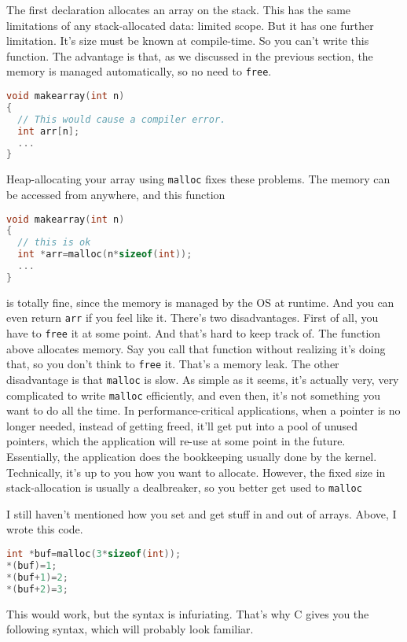 \documentclass[ebook,11pt,oneside,openany]{memoir}
\begin{document}
The first declaration allocates an array on the stack. This has the same limitations of any stack-allocated data: limited scope. But it has one further limitation. It's size must be known at compile-time. So you can't write this function. The advantage is that, as we discussed in the previous section, the memory is managed automatically, so no need to \texttt{free}.

\begin{lstlisting}[language=C]
void makearray(int n) 
{
  // This would cause a compiler error.
  int arr[n];
  ...
}
\end{lstlisting}

Heap-allocating your array using \texttt{malloc} fixes these problems. The memory can be accessed from anywhere, and this function 

\begin{lstlisting}[language=C]
void makearray(int n) 
{
  // this is ok
  int *arr=malloc(n*sizeof(int));
  ...
}
\end{lstlisting}

is totally fine, since the memory is managed by the OS at runtime. And you can even return \texttt{arr} if you feel like it. There's two disadvantages. First of all, you have to \texttt{free} it at some point. And that's hard to keep track of. The function above allocates memory. Say you call that function without realizing it's doing that, so you don't think to \texttt{free} it. That's a memory leak. The other disadvantage is that \texttt{malloc} is slow. As simple as it seems, it's actually very, very complicated to write \texttt{malloc} efficiently, and even then, it's not something you want to do all the time. In performance-critical applications, when a pointer is no longer needed, instead of getting freed, it'll get put into a pool of unused pointers, which the application will re-use at some point in the future. Essentially, the application does the bookkeeping usually done by the kernel. Technically, it's up to you how you want to allocate. However, the fixed size in stack-allocation is usually a dealbreaker, so you better get used to \texttt{malloc}

I still haven't mentioned how you set and get stuff in and out of arrays. Above, I wrote this code.

\begin{lstlisting}[language=C]
int *buf=malloc(3*sizeof(int));
*(buf)=1;
*(buf+1)=2;
*(buf+2)=3;
\end{lstlisting}

This would work, but the syntax is infuriating. That's why C gives you the following syntax, which will probably look familiar. 
\end{document}
